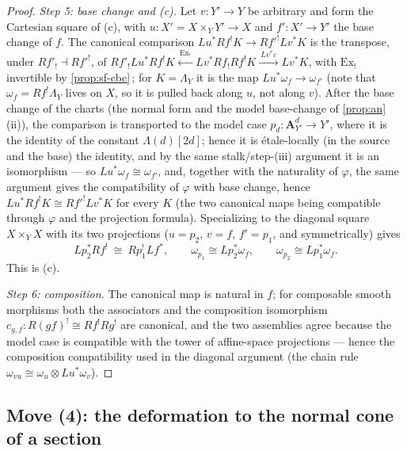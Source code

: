 \documentclass[11pt]{article}
\theoremstyle{plain}
\theoremstyle{definition}
\newcommand{\Aaf}{\mathbf A}
\newcommand{\Cref}[1]{\hyperref[#1]{\ref{#1}}\,\hyperref[#1]{\nameref*{#1}}}
\begin{document}
\begin{proof}
\emph{Step 5: base change and (c).}  Let $v:Y'\to Y$ be arbitrary and
form the Cartesian square of (c), with $u:X'=X\times_YY'\to X$ and
$f':X'\to Y'$ the base change of $f$.  The canonical comparison
$Lu^{*}Rf^{!}K\to Rf'^{!}Lv^{*}K$ is the transpose, under
$Rf'_!\dashv Rf'^{!}$, of
$Rf'_!Lu^{*}Rf^{!}K\xleftarrow{\ \mathrm{Ex}_!\ }Lv^{*}Rf_!Rf^{!}K
\xrightarrow{\ Lv^{*}\varepsilon\ }Lv^{*}K$, with $\mathrm{Ex}_!$ invertible
by \Cref{prop:sf-cbc}; for $K=\Lambda_Y$ it is the map
$Lu^{*}\omega_f\to\omega_{f'}$ (note that $\omega_f=Rf^{!}\Lambda_Y$ lives on
$X$, so it is pulled back along $u$, not along $v$).  After the base change
of the charts (the normal form and the model base-change of
\Cref{prop:an}(ii)), the comparison is transported to the model case
$p_d:\Aaf^d_{Y'}\to Y'$, where it is the identity of the constant
$\Lambda(d)[2d]$;  hence it is \'etale-locally (in the source and the base)
the identity, and by the same stalk/step-(iii) argument it is an isomorphism
--- so $Lu^{*}\omega_f\cong\omega_{f'}$, and, together with the naturality of
$\varphi$, the same argument gives the compatibility of $\varphi$ with base
change, hence $Lu^{*}Rf^{!}K\cong Rf'^{!}Lv^{*}K$ for every $K$ (the two
canonical maps being compatible through $\varphi$ and the projection
formula).  Specializing to the diagonal square $X\times_YX$ with its two
projections ($u=p_2$, $v=f$, $f'=p_1$, and symmetrically) gives
\[
Lp_2^{*}Rf^{!}\ \cong\ Rp_1^{!}Lf^{*},\qquad
\omega_{p_1}\cong Lp_2^{*}\omega_f,\qquad
\omega_{p_2}\cong Lp_1^{*}\omega_f .
\]
This is (c).

\emph{Step 6: composition.}  The canonical map is natural in $f$;
for composable smooth morphisms both the associators and the
composition isomorphism $c_{g,f}:R(gf)^{!}\cong Rf^{!}Rg^{!}$ are
canonical, and the two assemblies agree because the model case is
compatible with the tower of affine-space projections --- hence the
composition compatibility used in the diagonal argument (the chain
rule $\omega_{vu}\cong\omega_u\otimes Lu^{*}\omega_v$).
\end{proof}

\subsection{Move (4): the deformation to the normal cone of a section}
\end{document}
